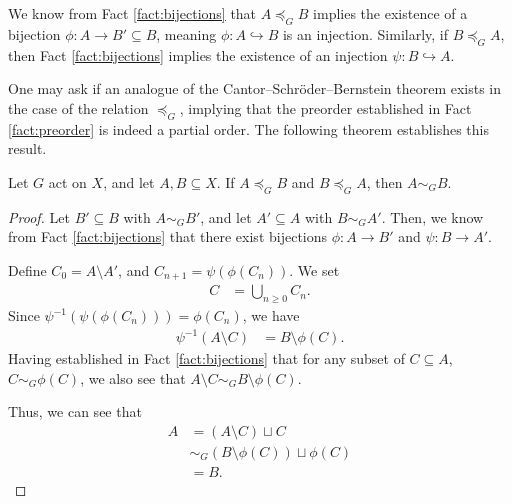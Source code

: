 \documentclass[10pt]{mypackage2}
\begin{document}
We know from Fact \ref{fact:bijections} that $A\preceq_{G}B$ implies the existence of a bijection $\phi\colon A\rightarrow B'\subseteq B$, meaning $\phi\colon A\hookrightarrow B$ is an injection. Similarly, if $B\preceq_{G}A$, then Fact \ref{fact:bijections} implies the existence of an injection $\psi\colon B\hookrightarrow A$.\newline

One may ask if an analogue of the Cantor--Schröder--Bernstein theorem exists in the case of the relation $\preceq_{G}$, implying that the preorder established in Fact \ref{fact:preorder} is indeed a partial order. The following theorem establishes this result.
\begin{theorem}
  Let $G$ act on $X$, and let $A,B\subseteq X$. If $A\preceq_{G}B$ and $B\preceq_{G}A$, then $A\sim_{G}B$.\label{thm:csb_for_equidecomposability}
\end{theorem}
\begin{proof}
  Let $B'\subseteq B$ with $A\sim_{G}B'$, and let $A'\subseteq A$ with $B\sim_{G}A'$. Then, we know from Fact \ref{fact:bijections} that there exist bijections $\phi\colon A\rightarrow B'$ and $\psi\colon B\rightarrow A'$.\newline

  Define $C_0 = A\setminus A'$, and $C_{n+1} = \psi\left(\phi\left(C_n\right)\right)$. We set
  \begin{align*}
    C &= \bigcup_{n\geq 0}C_{n}.
  \end{align*}
  Since $\psi^{-1}\left(\psi\left(\phi\left(C_n\right)\right)\right) = \phi\left(C_n\right)$, we have
  \begin{align*}
    \psi^{-1}\left(A\setminus C\right) &= B\setminus \phi(C).
  \end{align*}
  Having established in Fact \ref{fact:bijections} that for any subset of $C\subseteq A$, $C\sim_{G} \phi(C)$, we also see that $A\setminus C \sim_{G} B\setminus \phi(C)$.\newline

  Thus, we can see that
  \begin{align*}
    A &= \left(A\setminus C\right)\sqcup C\\
      &\sim_{G}\left(B\setminus \phi(C)\right)\sqcup \phi(C)\\
      &= B.
  \end{align*}
\end{proof}
\end{document}
